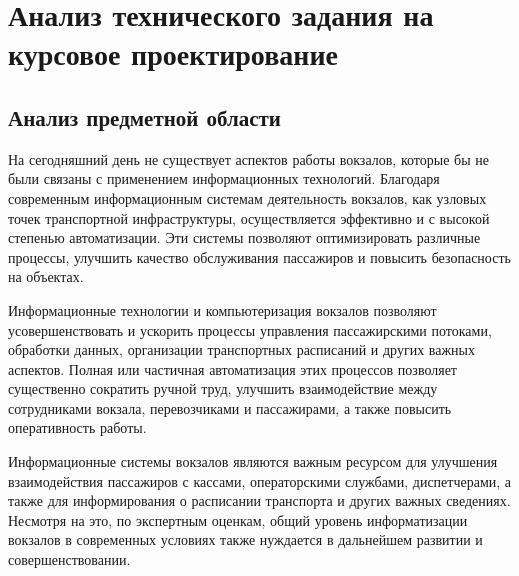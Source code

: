 \section{Анализ технического задания на курсовое проектирование}
\label{sec:analysis}

\subsection{Анализ предметной области}

На сегодняшний день не существует аспектов работы вокзалов, которые бы не были связаны с применением информационных технологий. Благодаря современным информационным системам деятельность вокзалов, как узловых точек транспортной инфраструктуры, осуществляется эффективно и с высокой степенью автоматизации. Эти системы позволяют оптимизировать различные процессы, улучшить качество обслуживания пассажиров и повысить безопасность на объектах.

Информационные технологии и компьютеризация вокзалов позволяют усовершенствовать и ускорить процессы управления пассажирскими потоками, обработки данных, организации транспортных расписаний и других важных аспектов. Полная или частичная автоматизация этих процессов позволяет существенно сократить ручной труд, улучшить взаимодействие между сотрудниками вокзала, перевозчиками и пассажирами, а также повысить оперативность работы.

Информационные системы вокзалов являются важным ресурсом для улучшения взаимодействия пассажиров с кассами, операторскими службами, диспетчерами, а также для информирования о расписании транспорта и других важных сведениях. Несмотря на это, по экспертным оценкам, общий уровень информатизации вокзалов в современных условиях также нуждается в дальнейшем развитии и совершенствовании.

